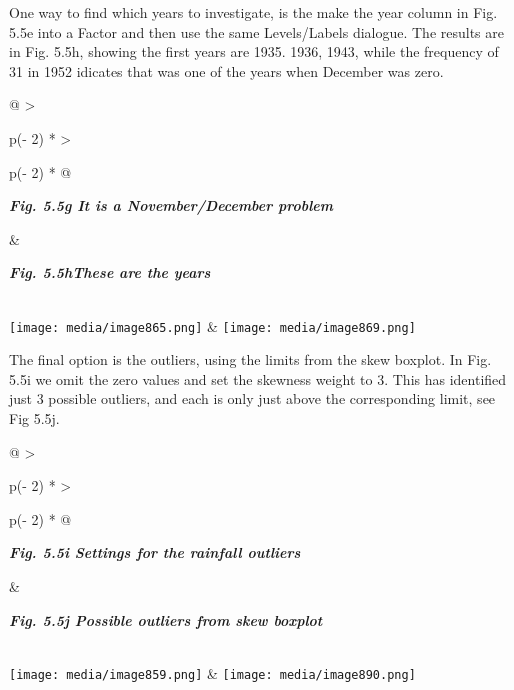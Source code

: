 \documentclass[
  letterpaper,
  DIV=11,
  numbers=noendperiod]{scrreprt}
\begin{document}
One way to find which years to investigate, is the make the year column
in Fig. 5.5e into a Factor and then use the same Levels/Labels dialogue.
The results are in Fig. 5.5h, showing the first years are 1935. 1936,
1943, while the frequency of 31 in 1952 idicates that was one of the
years when December was zero.

\begin{longtable}[]{@{}
  >{\raggedright\arraybackslash}p{(\columnwidth - 2\tabcolsep) * }
  >{\raggedright\arraybackslash}p{(\columnwidth - 2\tabcolsep) * }@{}}
\toprule\noalign{}
\begin{minipage}[b]{\linewidth}\raggedright
\textbf{\emph{Fig. 5.5g It is a November/December problem}}
\end{minipage} & \begin{minipage}[b]{\linewidth}\raggedright
\textbf{\emph{Fig. 5.5hThese are the years}}
\end{minipage} \\
\midrule\noalign{}
\endhead
\bottomrule\noalign{}
\endlastfoot
\texttt{[image: media/image865.png]} &
\texttt{[image: media/image869.png]} \\
\end{longtable}

The final option is the outliers, using the limits from the skew
boxplot. In Fig. 5.5i we omit the zero values and set the skewness
weight to 3. This has identified just 3 possible outliers, and each is
only just above the corresponding limit, see Fig 5.5j.

\begin{longtable}[]{@{}
  >{\raggedright\arraybackslash}p{(\columnwidth - 2\tabcolsep) * }
  >{\raggedright\arraybackslash}p{(\columnwidth - 2\tabcolsep) * }@{}}
\toprule\noalign{}
\begin{minipage}[b]{\linewidth}\raggedright
\textbf{\emph{Fig. 5.5i Settings for the rainfall outliers}}
\end{minipage} & \begin{minipage}[b]{\linewidth}\raggedright
\textbf{\emph{Fig. 5.5j Possible outliers from skew boxplot}}
\end{minipage} \\
\midrule\noalign{}
\endhead
\bottomrule\noalign{}
\endlastfoot
\texttt{[image: media/image859.png]} &
\texttt{[image: media/image890.png]} \\
\end{longtable}
\end{document}
